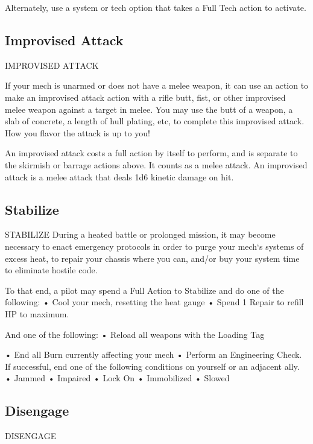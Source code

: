 Alternately, use a system or tech option that takes a Full Tech action to activate.
 \subsection{Improvised Attack}

                                      IMPROVISED ATTACK  

If your mech is unarmed or does not have a melee weapon, it can use an action to make an  
improvised attack action with a rifle butt, fist, or other improvised melee weapon against a target  
in melee. You may use the butt of a weapon, a slab of concrete, a length of hull plating, etc, to  
complete this improvised attack. How you flavor the attack is up to you!
 

An improvised attack costs a full action by itself to perform, and is separate to the skirmish or  
barrage actions above. It counts as a melee attack. An improvised attack is a melee attack that  
deals 1d6 kinetic damage on hit.  
\subsection{Stabilize}
                                              STABILIZE  
During a heated battle or prolonged mission, it may become necessary to enact emergency  
protocols in order to purge your mech‘s systems of excess heat, to repair your chassis where you  
can, and/or buy your system time to eliminate hostile code.  

To that end, a pilot may spend a Full Action to Stabilize and do one of the following:  
•  Cool your mech, resetting the heat gauge  
•  Spend 1 Repair to refill HP to maximum.  

And one of the following:  
•  Reload all weapons with the Loading Tag  

                                                                                                           


•  End all Burn currently affecting your mech  
•  Perform an Engineering Check. If successful, end one of the following conditions on yourself  
  or an adjacent ally.  
             •  Jammed  
             •  Impaired  
             •  Lock On  
             •  Immobilized  
             •  Slowed  
\subsection{Disengage}
                                            DISENGAGE  

